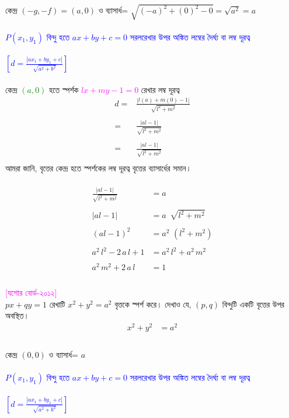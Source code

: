 \documentclass{article}
\begin{document}
\\
কেন্দ্র 	$(-g,-f)=(a,0)$ ও ব্যাসার্ধ= $\sqrt{(-a)^2+(0)^2-0}=\sqrt{a^2}=a$\\
\\   
\textcolor{blue}{$P(x_1,y_1)$ বিন্দু হতে  $ax+by+c=0$ সরলরেখার উপর অঙ্কিত লম্বের দৈর্ঘ্য বা লম্ব দূরত্ব \\
	\\
	$\left[d=\frac{|ax_1+by_1+c|}{\sqrt{a^2+b^2}}\right]$}\\
\\
কেন্দ্র \textcolor{green}{$(a,0)$} হতে স্পর্শক \textcolor{magenta}{$lx+my-1=0$}  রেখার লম্ব দূরত্ব \\
\begin{align*}
	d=	&\frac{|l(a)+m(0)-1|}{\sqrt{l^2+m^2}}\\
	\\
	=	&	\frac{|al-1|}{\sqrt{l^2+m^2}}\\
	\\
	=	&	\frac{|al-1|}{\sqrt{l^2+m^2}}\\
\end{align*}
আমরা জানি, বৃত্তের কেন্দ্র হতে স্পর্শকের লম্ব দূরত্ব বৃত্তের ব্যাসার্ধের সমান। \\
\\ 
\begin{align*}
		\frac{|al-1|}{\sqrt{l^2+m^2}}&=a\\
	\\
	|al-1|&=a\,\,\,\sqrt{l^2+m^2}\\
	\\
	(al-1)^2&= a^2\,\,(l^2+m^2)\\
	\\
	a^2\,l^2-2\,a\,l+1&=a^2\,l^2+a^2\,m^2\\
	\\
	a^2\,m^2+2\,a\,l&=1\\
\end{align*}
\\ 
\textcolor{magenta}{[যশোর বোর্ড-২০১২]}\\
$px+qy=1$ রেখাটি $x^2+y^2=a^2$ বৃত্তকে স্পর্শ করে। দেখাও যে,  $(p,q)$ বিন্দুটি একটি বৃত্তের উপর অবস্থিত। \\
	\begin{align*}
	x^2+y^2&=a^2\\
\end{align*}
\\
কেন্দ্র 	$(0,0)$ ও ব্যাসার্ধ= $a$\\
\\   
\textcolor{blue}{$P(x_1,y_1)$ বিন্দু হতে  $ax+by+c=0$ সরলরেখার উপর অঙ্কিত লম্বের দৈর্ঘ্য বা লম্ব দূরত্ব \\
	\\
	$\left[d=\frac{|ax_1+by_1+c|}{\sqrt{a^2+b^2}}\right]$}\\
\end{document}
